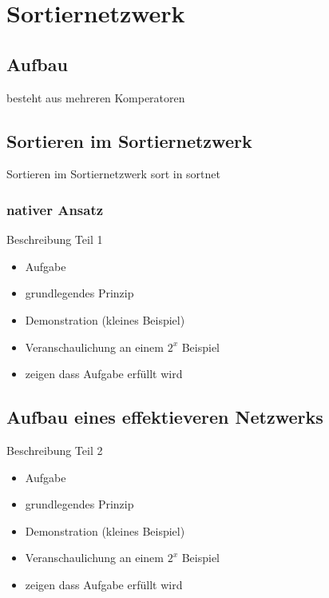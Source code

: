 \documentclass[ucs,9pt]{beamer}
\begin{document}

\section{Sortiernetzwerk}
\subsection{Aufbau}
\begin{frame}
besteht aus mehreren Komperatoren
\end{frame}
\subsection{Sortieren im Sortiernetzwerk}
\begin{frame}{Sortieren im Sortiernetzwerk}
sort in sortnet
\end{frame}
\subsubsection*{nativer Ansatz}
\begin{frame}{Beschreibung Teil 1}
\begin{itemize}
\item Aufgabe
\item grundlegendes Prinzip
\item Demonstration (kleines Beispiel)
\item Veranschaulichung an einem $2^x$ Beispiel
\item zeigen dass Aufgabe erfüllt wird
\end{itemize}
\end{frame}
\subsection*{Aufbau eines effektieveren Netzwerks}
\begin{frame}{Beschreibung Teil 2}
\begin{itemize}
\item Aufgabe
\item grundlegendes Prinzip
\item Demonstration (kleines Beispiel)
\item Veranschaulichung an einem $2^x$ Beispiel
\item zeigen dass Aufgabe erfüllt wird
\end{itemize}
\end{frame}
\end{document}
